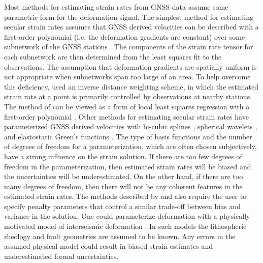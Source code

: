 \documentclass[extra,mreferee]{gji}
\begin{document}
Most methods for estimating strain rates from GNSS data assume some
parametric form for the deformation signal. The simplest method for
estimating secular strain rates assumes that GNSS derived velocities
can be described with a first-order polynomial (i.e, the deformation
gradients are constant) over some subnetwork of the GNSS stations
\citep[e.g.,][]{Feigl1990,Murray2000}. The components of the strain
rate tensor for each subnetwork are then determined from the least
squares fit to the observations. The assumption that deformation
gradients are spatially uniform is not appropriate when subnetworks
span too large of an area. To help overcome this deficiency,
\citet{Shen1996,Shen2015} used an inverse distance weighting scheme,
in which the estimated strain rate at a point is primarily controlled
by observations at nearby stations. The method of
\citet{Shen1996,Shen2015} can be viewed as a form of local least
squares regression with a first-order polynomial \citep[e.g.,][sec.
6]{Hastie2009}. Other methods for estimating secular strain rates have
parameterized GNSS derived velocities with bi-cubic splines
\citep{Beavan2001}, spherical wavelets \citep{Tape2009}, and
elastostatic Green's functions \citep{Sandwell2016}. The type of basis
functions and the number of degrees of freedom for a parameterization,
which are often chosen subjectively, have a strong influence on the
strain solution. If there are too few degrees of freedom in the
parameterization, then estimated strain rates will be biased and the
uncertainties will be underestimated. On the other hand, if there are
too many degrees of freedom, then there will not be any coherent
features in the estimated strain rates. The methods described by
\citet{Beavan2001} and \citet{Tape2009} also require the user to
specify penalty parameters that control a similar trade-off between
bias and variance in the solution. One could parameterize deformation
with a physically motivated model of interseismic deformation
\citep[e.g.,][]{Meade2005,McCaffrey2007}. In such models the
lithospheric rheology and fault geometries are assumed to be known.
Any errors in the assumed physical model could result in biased strain
estimates and underestimated formal uncertainties.

\end{document}
